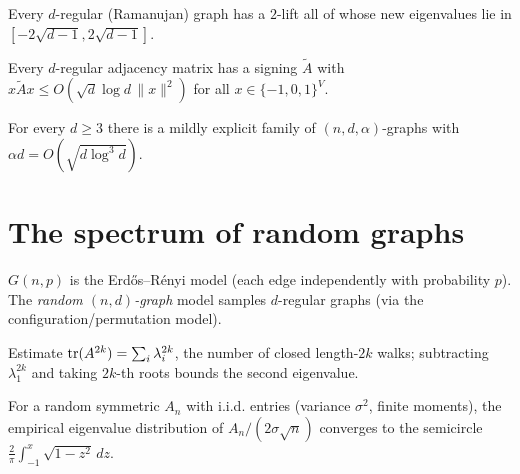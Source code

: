 \begin{theorem}
  \label{conj:good-2lift}
  \notready
  Every $d$-regular (Ramanujan) graph has a $2$-lift all of whose new eigenvalues
  lie in $[-2\sqrt{d-1},2\sqrt{d-1}]$.
\end{theorem}

\begin{lemma}
  \label{lem:bilu-linial-signing}
  \notready
  Every $d$-regular adjacency matrix has a signing $\tilde A$ with
  $x\tilde Ax\le O(\sqrt d\log d\,\|x\|^2)$ for all $x\in\{-1,0,1\}^V$.
\end{lemma}

\begin{theorem}
  \label{thm:bilu-linial}
  \notready
  For every $d\ge3$ there is a mildly explicit family of $(n,d,\alpha)$-graphs
  with $\alpha d=O(\sqrt{d\log^3d})$.
\end{theorem}


\chapter{The spectrum of random graphs}

\begin{definition}
  \label{def:random-graph-models}
  $G(n,p)$ is the Erdős--Rényi model (each edge independently with probability
  $p$). The \emph{random $(n,d)$-graph} model samples $d$-regular graphs (via the
  configuration/permutation model).
\end{definition}

\begin{definition}
  \label{def:trace-method}
  Estimate $\operatorname{tr}(A^{2k})=\sum_i\lambda_i^{2k}$, the number of closed length-$2k$
  walks; subtracting $\lambda_1^{2k}$ and taking $2k$-th roots bounds the second
  eigenvalue.
\end{definition}

\begin{theorem}
  \label{thm:wigner}
  \notready
  For a random symmetric $A_n$ with i.i.d. entries (variance $\sigma^2$, finite
  moments), the empirical eigenvalue distribution of $A_n/(2\sigma\sqrt n)$
  converges to the semicircle $\frac2\pi\int_{-1}^x\sqrt{1-z^2}\,dz$.
\end{theorem}

